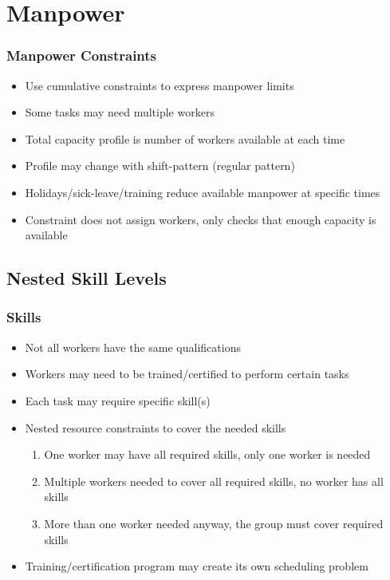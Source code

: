 \section{Manpower}

\begin{frame}
\frametitle{Manpower Constraints \avail}
\begin{itemize}
\item Use cumulative constraints to express manpower limits
\item Some tasks may need multiple workers
\item Total capacity profile is number of workers available at each time
\item Profile may change with shift-pattern (regular pattern)
\item Holidays/sick-leave/training reduce available manpower at specific times
\item Constraint does not assign workers, only checks that enough capacity is available
\end{itemize}
\end{frame}



\subsection{Nested Skill Levels}

\begin{frame}
\frametitle{Skills \navail}
\begin{itemize}
\item Not all workers have the same qualifications
\item Workers may need to be trained/certified to perform certain tasks
\item Each task may require specific skill(s)
\item Nested resource constraints to cover the needed skills
\begin{enumerate}
\item One worker may have all required skills, only one worker is needed
\item Multiple workers needed to cover all required skills, no worker has all skills
\item More than one worker needed anyway, the group must cover required skills
\end{enumerate}
\item Training/certification program may create its own scheduling problem
\end{itemize}
\end{frame}




